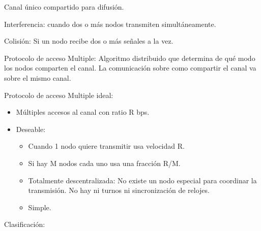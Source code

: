 \documentclass[12pt, twoside, openright]{report} %
\begin{document}
Canal único compartido para difusión.

Interferencia: cuando dos o más nodos transmiten simultáneamente.

Colisión: Si un nodo recibe dos o más señales a la vez.

Protocolo de acceso Multiple: Algoritmo distribuido que determina de
qué modo los nodos comparten el canal. La comunicación sobre como
compartir el canal va sobre el mismo canal.

Protocolo de acceso Multiple ideal:

\begin{itemize}
	\item Múltiples accesos al canal con ratio R bps.
	\item Deseable:

	      \begin{itemize}
		      \item Cuando 1 nodo quiere transmitir usa velocidad R.
		      \item Si hay M nodos cada uno usa una fracción R/M.
		      \item Totalmente descentralizada: No existe un nodo especial para
		            coordinar la transmisión. No hay ni turnos ni sincronización de
		            relojes.
		      \item Simple.
	      \end{itemize}
\end{itemize}

Clasificación:
\end{document}
